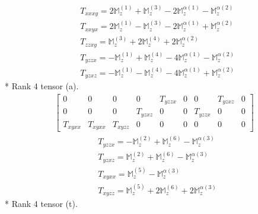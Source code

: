 \documentclass[fleqn,8pt,landscape]{jsarticle}
\begin{document}
\begin{align*}
& T_{xxxy} = 2 \mathbb{M}_{z}^{(1)} + \mathbb{M}_{z}^{(3)} - 2 \mathbb{M}_{z}^{\alpha(1)} - \mathbb{M}_{z}^{\alpha(2)} \\
& T_{xxyx} = 2 \mathbb{M}_{z}^{(1)} - \mathbb{M}_{z}^{(3)} - 2 \mathbb{M}_{z}^{\alpha(1)} + \mathbb{M}_{z}^{\alpha(2)} \\
& T_{zzxy} = \mathbb{M}_{z}^{(3)} + 2 \mathbb{M}_{z}^{(4)} + 2 \mathbb{M}_{z}^{\alpha(2)} \\
& T_{yzzx} = - \mathbb{M}_{z}^{(1)} + \mathbb{M}_{z}^{(4)} - 4 \mathbb{M}_{z}^{\alpha(1)} - \mathbb{M}_{z}^{\alpha(2)} \\
& T_{yzxz} = - \mathbb{M}_{z}^{(1)} - \mathbb{M}_{z}^{(4)} - 4 \mathbb{M}_{z}^{\alpha(1)} + \mathbb{M}_{z}^{\alpha(2)}
\end{align*}
* Rank 4 tensor (a).
\begin{align*}
\begin{bmatrix} 0 & 0 & 0 & 0 & T_{yzzx} & 0 & 0 & T_{yzxz} & 0 \\ 0 & 0 & 0 & T_{yzxz} & 0 & 0 & T_{yzzx} & 0 & 0 \\ T_{xyxx} & T_{xyxx} & T_{xyzz} & 0 & 0 & 0 & 0 & 0 & 0 \end{bmatrix}
\end{align*}
\begin{align*}
& T_{yzzx} = - \mathbb{M}_{z}^{(2)} + \mathbb{M}_{z}^{(6)} - \mathbb{M}_{z}^{\alpha(3)} \\
& T_{yzxz} = \mathbb{M}_{z}^{(2)} + \mathbb{M}_{z}^{(6)} - \mathbb{M}_{z}^{\alpha(3)} \\
& T_{xyxx} = \mathbb{M}_{z}^{(5)} - \mathbb{M}_{z}^{\alpha(3)} \\
& T_{xyzz} = \mathbb{M}_{z}^{(5)} + 2 \mathbb{M}_{z}^{(6)} + 2 \mathbb{M}_{z}^{\alpha(3)}
\end{align*}
* Rank 4 tensor (t).
\end{document}
